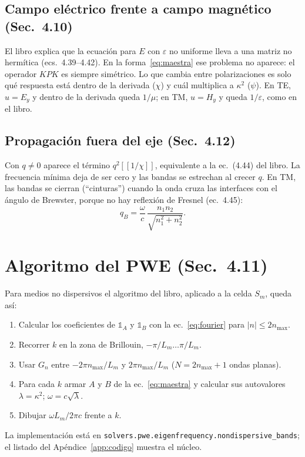 \documentclass[11pt,a4paper]{article}
\newcommand{\toep}[1]{[\![#1]\!]}
\newcommand{\code}[1]{\texttt{#1}}
\begin{document}
\subsection{Campo eléctrico frente a campo magnético (Sec.~4.10)}

El libro explica que la ecuación para $E$ con $\varepsilon$ no uniforme lleva a
una matriz no hermítica (ecs.~4.39--4.42). En la forma~\eqref{eq:maestra}
ese problema no aparece: el operador $K P K$ es siempre simétrico. Lo que cambia
entre polarizaciones es solo qué respuesta está dentro de la derivada
($\chi$) y cuál multiplica a $\kappa^2$ ($\psi$). En TE, $u=E_y$ y dentro de la
derivada queda $1/\mu$; en TM, $u=H_y$ y queda $1/\varepsilon$, como en el
libro.

\subsection{Propagación fuera del eje (Sec.~4.12)}

Con $q\neq0$ aparece el término $q^2\toep{1/\chi}$, equivalente a la ec.~(4.44)
del libro. La frecuencia mínima deja de ser cero y las bandas se estrechan al
crecer $q$. En TM, las bandas se cierran (``cinturas'') cuando la onda cruza las
interfaces con el ángulo de Brewster, porque no hay reflexión de Fresnel
(ec.~4.45):
\begin{equation}
q_B=\frac{\omega}{c}\,\frac{n_1n_2}{\sqrt{n_1^2+n_2^2}} .
\label{eq:brewster}
\end{equation}

\section{Algoritmo del PWE (Sec.~4.11)}\label{sec:algoritmo-libro}

Para medios no dispersivos el algoritmo del libro, aplicado a la celda $S_m$,
queda así:
\begin{enumerate}[label=\arabic*.]
\item Calcular los coeficientes de $\mathbb 1_A$ y $\mathbb 1_B$ con la
ec.~\eqref{eq:fourier} para $|n|\le 2n_{\max}$.
\item Recorrer $k$ en la zona de Brillouin, $-\pi/L_m\dots\pi/L_m$.
\item Usar $G_n$ entre $-2\pi n_{\max}/L_m$ y $2\pi n_{\max}/L_m$ ($N=2n_{\max}+1$
ondas planas).
\item Para cada $k$ armar $A$ y $B$ de la ec.~\eqref{eq:maestra} y calcular sus
autovalores $\lambda=\kappa^2$; $\omega=c\sqrt\lambda$.
\item Dibujar $\omega L_m/2\pi c$ frente a $k$.
\end{enumerate}
La implementación está en \code{solvers.pwe.eigenfrequency.nondispersive\_bands}; el
listado del Apéndice~\ref{app:codigo} muestra el núcleo.
\end{document}
